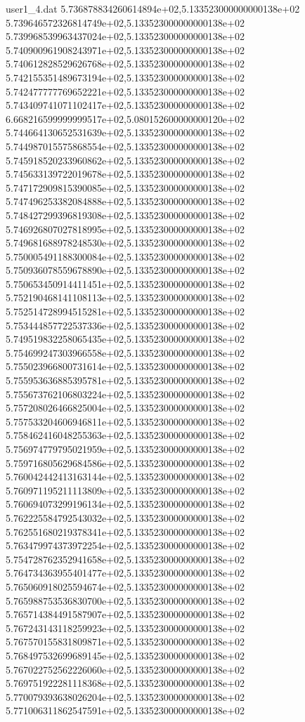 \begin{filecontents}{user1_4.dat}
5.736878834260614894e+02,5.133523000000000138e+02
5.739646572326814749e+02,5.133523000000000138e+02
5.739968539963437024e+02,5.133523000000000138e+02
5.740900961908243971e+02,5.133523000000000138e+02
5.740612828529626768e+02,5.133523000000000138e+02
5.742155351489673194e+02,5.133523000000000138e+02
5.742477777769652221e+02,5.133523000000000138e+02
5.743409741071102417e+02,5.133523000000000138e+02
6.668216599999999517e+02,5.080152600000000120e+02
5.744664130652531639e+02,5.133523000000000138e+02
5.744987015575868554e+02,5.133523000000000138e+02
5.745918520233960862e+02,5.133523000000000138e+02
5.745633139722019678e+02,5.133523000000000138e+02
5.747172909815390085e+02,5.133523000000000138e+02
5.747496253382084888e+02,5.133523000000000138e+02
5.748427299396819308e+02,5.133523000000000138e+02
5.746926807027818995e+02,5.133523000000000138e+02
5.749681688978248530e+02,5.133523000000000138e+02
5.750005491188300084e+02,5.133523000000000138e+02
5.750936078559678890e+02,5.133523000000000138e+02
5.750653450914411451e+02,5.133523000000000138e+02
5.752190468141108113e+02,5.133523000000000138e+02
5.752514728994515281e+02,5.133523000000000138e+02
5.753444857722537336e+02,5.133523000000000138e+02
5.749519832258065435e+02,5.133523000000000138e+02
5.754699247303966558e+02,5.133523000000000138e+02
5.755023966800731614e+02,5.133523000000000138e+02
5.755953636885395781e+02,5.133523000000000138e+02
5.755673762106803224e+02,5.133523000000000138e+02
5.757208026466825004e+02,5.133523000000000138e+02
5.757533204606946811e+02,5.133523000000000138e+02
5.758462416048255363e+02,5.133523000000000138e+02
5.756974779795021959e+02,5.133523000000000138e+02
5.759716805629684586e+02,5.133523000000000138e+02
5.760042442413163144e+02,5.133523000000000138e+02
5.760971195211113809e+02,5.133523000000000138e+02
5.760694073299196134e+02,5.133523000000000138e+02
5.762225584792543032e+02,5.133523000000000138e+02
5.762551680219378341e+02,5.133523000000000138e+02
5.763479974373972254e+02,5.133523000000000138e+02
5.754728762352941658e+02,5.133523000000000138e+02
5.764734363955401477e+02,5.133523000000000138e+02
5.765060918025594674e+02,5.133523000000000138e+02
5.765988753536830700e+02,5.133523000000000138e+02
5.765714384491587907e+02,5.133523000000000138e+02
5.767243143118259923e+02,5.133523000000000138e+02
5.767570155831809871e+02,5.133523000000000138e+02
5.768497532699689145e+02,5.133523000000000138e+02
5.767022752562226060e+02,5.133523000000000138e+02
5.769751922281118368e+02,5.133523000000000138e+02
5.770079393638026204e+02,5.133523000000000138e+02
5.771006311862547591e+02,5.133523000000000138e+02

\end{filecontents}
